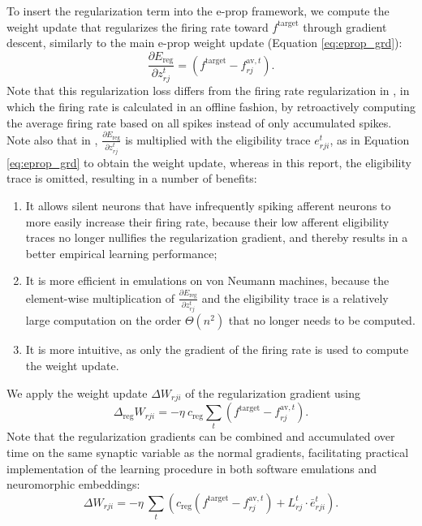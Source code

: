 		To insert the regularization term into the e-prop framework, we compute the weight update that regularizes the firing rate toward $f^\text{target}$ through gradient descent, similarly to the main e-prop weight update (Equation \ref{eq:eprop_grd}):
		\begin{equation}
		\frac{\partial E_\text{reg}}{\partial z_{rj}^t} = \left(f^\text{target} - f^{\text{av}, t}_{rj}\right).
		\end{equation}
		Note that this regularization loss differs from the firing rate regularization in \cite{bellec2020solution}, in which the firing rate is calculated in an offline fashion, by retroactively computing the average firing rate based on all spikes instead of only accumulated spikes.
		Note also that in \cite{bellec2020solution}, $\frac{\partial E_\text{reg}}{\partial z_{rj}^t}$ is multiplied with the eligibility trace $e^t_{rji}$, as in Equation \ref{eq:eprop_grd} to obtain the weight update, whereas in this report, the eligibility trace is omitted, resulting in a number of benefits:
		\begin{enumerate}
			\item It allows silent neurons that have infrequently spiking afferent neurons to more easily increase their firing rate, because their low afferent eligibility traces no longer nullifies the regularization gradient, and thereby results in a better empirical learning performance;
			\item It is more efficient in emulations on von Neumann machines, because the element-wise multiplication of $\frac{\partial E_\text{reg}}{\partial z_{rj}^t}$ and the eligibility trace is a relatively large computation on the order $\Theta\!\left(n^2\right)$ that no longer needs to be computed.
			\item It is more intuitive, as only the gradient of the firing rate is used to compute the weight update.
		\end{enumerate}
		We apply the weight update $\Delta W_{rji}$ of the regularization gradient using
		\begin{equation}
		\Delta_\text{reg} W_{rji} = -\eta\ c_\text{reg}\sum_t\left(f^\text{target} - f^{\text{av}, t}_{rj}\right).
		\end{equation}
		Note that the regularization gradients can be combined and accumulated over time on the same synaptic variable as the normal gradients, facilitating practical implementation of the learning procedure in both software emulations and neuromorphic embeddings:
		\begin{equation}
		\Delta W_{rji} = -\eta\ \sum_t\left(c_\text{reg}\left(f^\text{target} - f^{\text{av}, t}_{rj}\right) + L^t_{rj}\cdot\bar{e}^t_{rji}\right).
		\end{equation}


